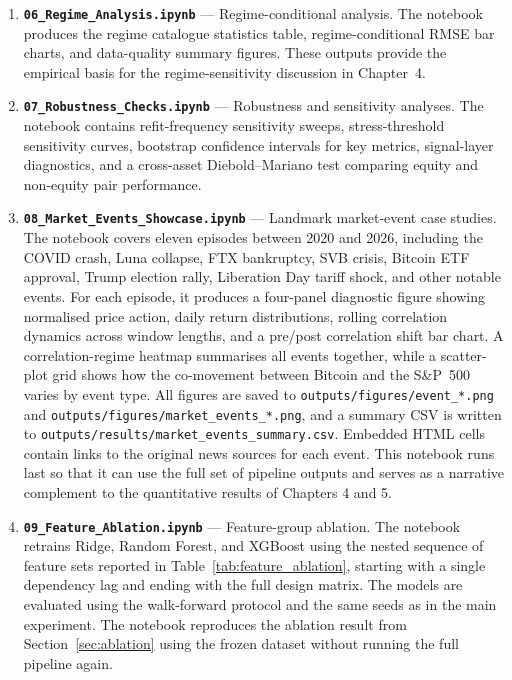 \begin{enumerate}
    \item \textbf{\texttt{06\_Regime\_Analysis.ipynb}} --- Regime-conditional analysis. The notebook produces the regime catalogue statistics table, regime-conditional RMSE bar charts, and data-quality summary figures. These outputs provide the empirical basis for the regime-sensitivity discussion in Chapter~4.

    \item \textbf{\texttt{07\_Robustness\_Checks.ipynb}} --- Robustness and sensitivity analyses. The notebook contains refit-frequency sensitivity sweeps, stress-threshold sensitivity curves, bootstrap confidence intervals for key metrics, signal-layer diagnostics, and a cross-asset Diebold--Mariano test comparing equity and non-equity pair performance.

    \item \textbf{\texttt{08\_Market\_Events\_Showcase.ipynb}} --- Landmark market-event case studies. The notebook covers eleven episodes between 2020 and 2026, including the COVID crash, Luna collapse, FTX bankruptcy, SVB crisis, Bitcoin ETF approval, Trump election rally, Liberation Day tariff shock, and other notable events. For each episode, it produces a four-panel diagnostic figure showing normalised price action, daily return distributions, rolling correlation dynamics across window lengths, and a pre/post correlation shift bar chart. A correlation-regime heatmap summarises all events together, while a scatter-plot grid shows how the co-movement between Bitcoin and the S\&P~500 varies by event type. All figures are saved to \texttt{outputs/figures/event\_*.png} and \texttt{outputs/figures/market\_events\_*.png}, and a summary CSV is written to \texttt{outputs/results/market\_events\_summary.csv}. Embedded HTML cells contain links to the original news sources for each event. This notebook runs last so that it can use the full set of pipeline outputs and serves as a narrative complement to the quantitative results of Chapters 4 and 5.

    \item \textbf{\texttt{09\_Feature\_Ablation.ipynb}} --- Feature-group ablation. The notebook retrains Ridge, Random Forest, and XGBoost using the nested sequence of feature sets reported in Table~\ref{tab:feature_ablation}, starting with a single dependency lag and ending with the full design matrix. The models are evaluated using the walk-forward protocol and the same seeds as in the main experiment. The notebook reproduces the ablation result from Section~\ref{sec:ablation} using the frozen dataset without running the full pipeline again.
\end{enumerate}


